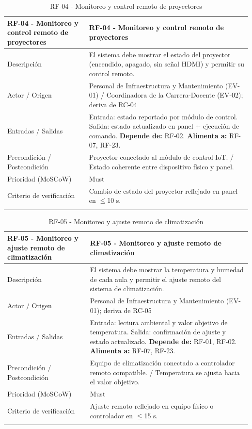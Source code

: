 \begingroup
\small
\begin{longtable}{|P{0.5000}|P{0.5000}|}
\hline
RF-04 - Monitoreo y control remoto de proyectores & RF-04 - Monitoreo y control remoto de proyectores \\ \hline
Descripción & El sistema debe mostrar el estado del proyector (encendido, apagado, sin señal HDMI) y permitir su control remoto. \\ \hline
Actor / Origen & Personal de Infraestructura y Mantenimiento (EV-01) / Coordinadora de la Carrera-Docente (EV-02); deriva de RC-04 \\ \hline
Entradas / Salidas & Entrada: estado reportado por módulo de control. Salida: estado actualizado en panel + ejecución de comando. \textbf{Depende de:} RF-02. \textbf{Alimenta a:} RF-07, RF-23. \\ \hline
Precondición / Postcondición & Proyector conectado al módulo de control IoT. / Estado coherente entre dispositivo físico y panel. \\ \hline
Prioridad (MoSCoW) & Must \\ \hline
Criterio de verificación & Cambio de estado del proyector reflejado en panel en $\leq$10 s. \\ \hline
\caption{RF-04 - Monitoreo y control remoto de proyectores}
\end{longtable}
\endgroup

\begingroup
\small
\begin{longtable}{|P{0.5000}|P{0.5000}|}
\hline
RF-05 - Monitoreo y ajuste remoto de climatización & RF-05 - Monitoreo y ajuste remoto de climatización \\ \hline
Descripción & El sistema debe mostrar la temperatura y humedad de cada aula y permitir el ajuste remoto del sistema de climatización. \\ \hline
Actor / Origen & Personal de Infraestructura y Mantenimiento (EV-01); deriva de RC-05 \\ \hline
Entradas / Salidas & Entrada: lectura ambiental y valor objetivo de temperatura. Salida: confirmación de ajuste y estado actualizado. \textbf{Depende de:} RF-01, RF-02. \textbf{Alimenta a:} RF-07, RF-23. \\ \hline
Precondición / Postcondición & Equipo de climatización conectado a controlador remoto compatible. / Temperatura se ajusta hacia el valor objetivo. \\ \hline
Prioridad (MoSCoW) & Must \\ \hline
Criterio de verificación & Ajuste remoto reflejado en equipo físico o controlador en $\leq$15 s. \\ \hline
\caption{RF-05 - Monitoreo y ajuste remoto de climatización}
\end{longtable}
\endgroup


